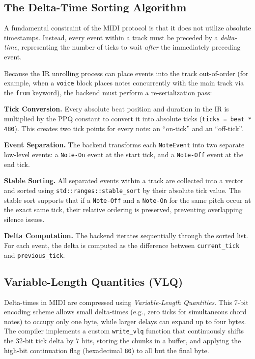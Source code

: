 \subsection{The Delta-Time Sorting Algorithm}\label{detail-subsec:the-delta-time-sorting-algorithm}

A fundamental constraint of the MIDI protocol is that it does not utilize absolute timestamps.
Instead, every event within a track must be preceded by a \textit{delta-time}, representing the number of ticks to wait
\textit{after} the immediately preceding event.

Because the IR unrolling process can place events into the track out-of-order (for example, when a \texttt{voice} block
places notes concurrently with the main track via the \texttt{from} keyword), the backend must perform a
re-serialization pass:

\noindent \textbf{Tick Conversion.} Every absolute beat position and duration in the IR is multiplied by the
PPQ constant
to convert it into absolute ticks (\texttt{ticks = beat * 480}).
This creates two tick points for every note: an ``on-tick'' and an ``off-tick''.

\noindent \textbf{Event Separation.} The backend transforms each \texttt{NoteEvent} into two separate
low-level events: a
\texttt{Note-On} event at the start tick, and a \texttt{Note-Off} event at the end tick.

\noindent \textbf{Stable Sorting.} All separated events within a track are collected into a vector and sorted using
\texttt{std::ranges::stable\_sort} by their absolute tick value.
The stable sort supports that if a \texttt{Note-Off} and a \texttt{Note-On} for the same pitch occur at the exact
same tick, their relative ordering is preserved, preventing overlapping silence issues.

\noindent \textbf{Delta Computation.} The backend iterates sequentially through the sorted list.
For each event, the delta is computed as the difference between \texttt{current\_tick} and
\texttt{previous\_tick}.

\subsection{Variable-Length Quantities (VLQ)}\label{detail-subsec:variable-length-quantities-(vlq)}

Delta-times in MIDI are compressed using \textit{Variable-Length Quantities}.
This 7-bit encoding scheme allows small delta-times (e.g., zero ticks for simultaneous chord notes) to occupy only one
byte, while larger delays can expand up to four bytes.
The compiler implements a custom \texttt{write\_vlq} function that continuously shifts the 32-bit tick delta by 7 bits,
storing the chunks in a buffer, and applying the high-bit continuation flag (hexadecimal \texttt{80}) to all but the
final byte.

